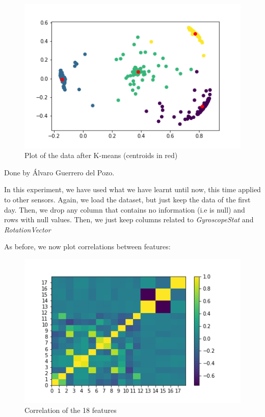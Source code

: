 \documentclass[idxtotoc,hyperref,openany]{labbook} %
\begin{document}
\begin{figure}[h]
\includegraphics[width=0.9\linewidth]{KMeans_Plot_Accelerometer_Day1_Selected.png}
\setlength\belowcaptionskip{-10pt}
\caption{Plot of the data after K-means (centroids in red)}
\label{K-Means plot 1 Selected}
\end{figure}




Done by \'Alvaro Guerrero del Pozo.

In this experiment, we have used what we have learnt until now, this time applied to other sensors. Again, we load the dataset, but just keep the data of the first day. Then, we drop any column that contains no information (i.e is null) and rows with null values. Then, we just keep columns related to \textit{GyroscopeStat} and \textit{RotationVector}

As before, we now plot correlations between features:

\begin{figure}[h]
\includegraphics[width=0.9\linewidth]{2710/Features_CorrelationMatrix_preDrop.png}
\setlength\belowcaptionskip{-10pt}
\caption{Correlation of the 18 features}
\label{Correlation Predrop Gyroscope}
\end{figure}
\end{document}
